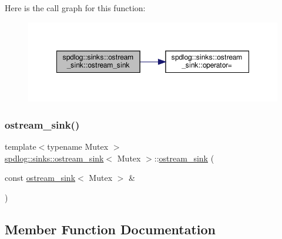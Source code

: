 Here is the call graph for this function\+:
\nopagebreak
\begin{figure}[H]
\begin{center}
\leavevmode
\includegraphics[width=348pt]{classspdlog_1_1sinks_1_1ostream__sink_aa038c6518dc69c08a1251e7469bc4fd8_cgraph}
\end{center}
\end{figure}
\mbox{\label{classspdlog_1_1sinks_1_1ostream__sink_a761f1c26210fe42673af4734b38fe167}} 
\subsubsection{\texorpdfstring{ostream\+\_\+sink()}{ostream\_sink()}\hspace{0.1cm}{\footnotesize\ttfamily [2/2]}}
{\footnotesize\ttfamily template$<$typename Mutex $>$ \\
\hyperlink{classspdlog_1_1sinks_1_1ostream__sink}{spdlog\+::sinks\+::ostream\+\_\+sink}$<$ Mutex $>$\+::\hyperlink{classspdlog_1_1sinks_1_1ostream__sink}{ostream\+\_\+sink} (\begin{DoxyParamCaption}\item[{const \hyperlink{classspdlog_1_1sinks_1_1ostream__sink}{ostream\+\_\+sink}$<$ Mutex $>$ \&}]{ }\end{DoxyParamCaption})\hspace{0.3cm}{\ttfamily [delete]}}



\subsection{Member Function Documentation}
\mbox{\label{classspdlog_1_1sinks_1_1ostream__sink_a96458aa6b79019744ef4cb61979c39e0}} 
